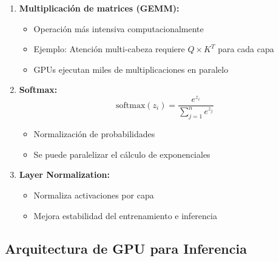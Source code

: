 \documentclass[12pt,a4paper]{article}
\begin{document}
\begin{enumerate}
    \item \textbf{Multiplicación de matrices (GEMM):}
    \begin{itemize}
        \item Operación más intensiva computacionalmente
        \item Ejemplo: Atención multi-cabeza requiere $Q \times K^T$ para cada capa
        \item GPUs ejecutan miles de multiplicaciones en paralelo
    \end{itemize}

    \item \textbf{Softmax:}
    \[
    \text{softmax}(z_i) = \frac{e^{z_i}}{\sum_{j=1}^n e^{z_j}}
    \]
    \begin{itemize}
        \item Normalización de probabilidades
        \item Se puede paralelizar el cálculo de exponenciales
    \end{itemize}

    \item \textbf{Layer Normalization:}
    \begin{itemize}
        \item Normaliza activaciones por capa
        \item Mejora estabilidad del entrenamiento e inferencia
    \end{itemize}
\end{enumerate}

\subsection{Arquitectura de GPU para Inferencia}
\end{document}
